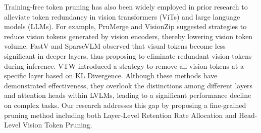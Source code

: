 Training-free token pruning has also been widely employed in prior research to alleviate token redundancy in vision transformers (ViTs) and large language models (LLMs). For example, PruMerge \cite{shang2024llava} and VisionZip \cite{yang2024visionzip} suggested strategies to reduce vision tokens generated by vision encoders, thereby lowering vision token volume. FastV \cite{chen2024image} and SparseVLM \cite{zhang2024sparsevlm} observed that visual tokens become less significant in deeper layers, thus proposing to eliminate redundant vision tokens during inference. VTW \cite{lin2024boosting} introduced a strategy to remove all vision tokens at a specific layer based on KL Divergence. Although these methods have demonstrated effectiveness, they overlook the distinctions among different layers and attention heads within LVLMs, leading to a significant performance decline on complex tasks. Our research addresses this gap by proposing a fine-grained pruning method including both Layer-Level Retention Rate Allocation and Head-Level Vision Token Pruning.
